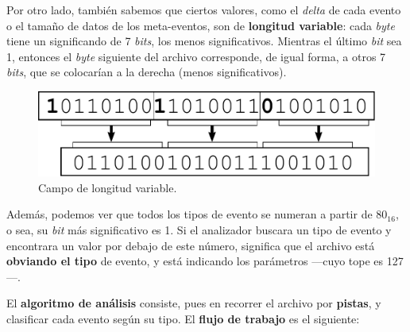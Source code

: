 \smallskip

Por otro lado, también sabemos que ciertos valores, como el \textit{delta} de cada evento o el tamaño de datos de los meta-eventos, son de \textbf{longitud variable}: cada \textit{byte} tiene un significando de 7 \textit{bits}, los menos significativos. Mientras el último \textit{bit} sea 1, entonces el \textit{byte} siguiente del archivo corresponde, de igual forma, a otros 7 \textit{bits}, que se colocarían a la derecha (menos significativos).

\smallskip

\begin{figure}[H]
	\noindent \begin{centering}
		\includegraphics[width=\linewidth/2]{capitulo5/varlen}
		\par\end{centering}
	\smallskip
	\caption{\label{fig:varlen} Campo de longitud variable.}
\end{figure}

\smallskip

Además, podemos ver que todos los tipos de evento se numeran a partir de $80_{16}$, o sea, su \textit{bit} más significativo es 1. Si el analizador buscara un tipo de evento y encontrara un valor por debajo de este número, significa que el archivo está \textbf{obviando el tipo} de evento, y está indicando los parámetros ---cuyo tope es 127---.

El \textbf{algoritmo de análisis} consiste, pues en recorrer el archivo por \textbf{pistas}, y clasificar cada evento según su tipo. El \textbf{flujo de trabajo} es el siguiente:

\smallskip

